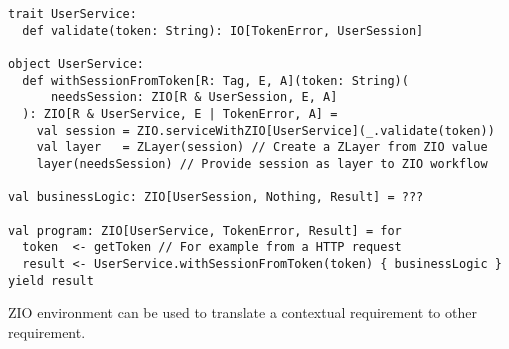 \begin{algorithm}

\begin{verbatim}
trait UserService:
  def validate(token: String): IO[TokenError, UserSession]

object UserService:
  def withSessionFromToken[R: Tag, E, A](token: String)(
      needsSession: ZIO[R & UserSession, E, A]
  ): ZIO[R & UserService, E | TokenError, A] =
    val session = ZIO.serviceWithZIO[UserService](_.validate(token))
    val layer   = ZLayer(session) // Create a ZLayer from ZIO value
    layer(needsSession) // Provide session as layer to ZIO workflow

val businessLogic: ZIO[UserSession, Nothing, Result] = ???

val program: ZIO[UserService, TokenError, Result] = for
  token  <- getToken // For example from a HTTP request
  result <- UserService.withSessionFromToken(token) { businessLogic }
yield result
\end{verbatim}

\caption{ZIO environment can be used to translate a contextual requirement to other requirement. \label{zio:user-session}}
\end{algorithm}